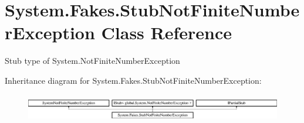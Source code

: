 \hypertarget{class_system_1_1_fakes_1_1_stub_not_finite_number_exception}{\section{System.\-Fakes.\-Stub\-Not\-Finite\-Number\-Exception Class Reference}
\label{class_system_1_1_fakes_1_1_stub_not_finite_number_exception}
}


Stub type of System.\-Not\-Finite\-Number\-Exception 


Inheritance diagram for System.\-Fakes.\-Stub\-Not\-Finite\-Number\-Exception\-:\begin{figure}[H]
\begin{center}
\leavevmode
\includegraphics[height=1.232123cm]{class_system_1_1_fakes_1_1_stub_not_finite_number_exception}
\end{center}
\end{figure}
